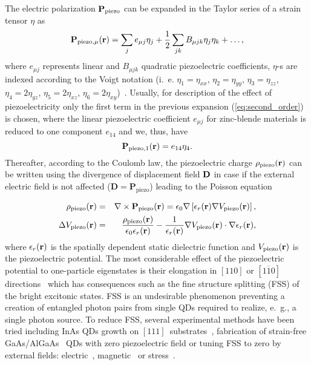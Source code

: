 The electric polarization $\mathbf{P}_{{\rm piezo}}$ can be expanded in the Taylor series of a strain tensor $\eta$ as
\begin{equation}
\mathbf{P}_{{\rm piezo},\mu}(\mathbf{r})=%
\sum_je_{\mu j}\eta_j+\frac{1}{2}\sum_{jk}B_{\mu jk}\eta_j\eta_k+\dots ,\label{eq:second_order}
\end{equation}
where $e_{\mu j}$ represents linear and $B_{\mu jk}$ quadratic piezoelectric coefficients, $\eta$-s are indexed according to the Voigt notation (i.~e. $\eta_1=\eta_{xx}$, $\eta_2=\eta_{yy}$, $\eta_3=\eta_{zz}$, $\eta_4=2\eta_{yz}$, $\eta_5=2\eta_{xz}$, $\eta_6=2\eta_{xy}$)~\citep{voigt_notation, Beya-Wakata2011}. 
Usually, for description of the effect of piezoelectricity only the first term in the previous expansion (\ref{eq:second_order}) is chosen, where the linear piezoelectric coefficient $e_{\mu j}$ for zinc-blende materials is reduced to one component $e_{14}$ and we, thus, have
\begin{equation}
\mathbf{P}_{{\rm piezo},1}(\mathbf{r})=%
e_{14 }\eta_4 \label{eq:first_order}.
\end{equation}
%
Thereafter, according to the Coulomb law, the piezoelectric charge $\rho_{\rm piezo}(\bf{r})$ can be written using the divergence of displacement field $\bf{ D}$ in case if the external electric field is not affected ($\mathbf{D}=\mathbf{P}_\mathrm{piezo}$) leading to the Poisson equation

\begin{eqnarray}
\rho_{\rm piezo}(\mathbf{r})&=&\nabla\times\mathbf{P}_{\rm piezo}(\mathbf{r})=\epsilon_0\nabla\left[\epsilon_r(\mathbf{r})\nabla V_{\rm piezo}(\mathbf{r})\right],\\
\Delta V_{\rm piezo}(\mathbf{r})&=&\frac{\rho_{\rm piezo}(\mathbf{r})}{\epsilon_0\epsilon_r(\mathbf{r})}-\frac{1}{\epsilon_r(\mathbf{r})}\nabla V_{\rm piezo}(\mathbf{r})\cdot\nabla\epsilon_r(\mathbf{r}),
\end{eqnarray}
%
where $\epsilon_r(\bf{r})$ is the spatially dependent static dielectric function and $V_{\rm piezo}(\bf{r})$ is the piezoelectric potential. The most considerable effect of the piezoelectric potential to one-particle eigenstates is their elongation in $[110]$ or $[1\overline{1}0]$ directions~\citep{Stier1999} which has consequences such as the fine structure splitting (FSS) of the bright excitonic states. FSS is an undesirable phenomenon preventing a creation of entangled photon pairs from single QDs required to realize, e.~g., a single photon source. To reduce FSS, several experimental methods have been tried including InAs QDs growth on $[111]$~substrates~\citep{StockFSS}, fabrication of strain-free GaAs/AlGaAs~\citep{Abbarchi_2008} QDs with zero piezoelectric field or tuning FSS to zero by external fields: electric~\citep{Gerardot_2007, Vogel_2007}, magnetic~\citep{Stevenson_2006} or stress~\citep{kleDresden}. 

